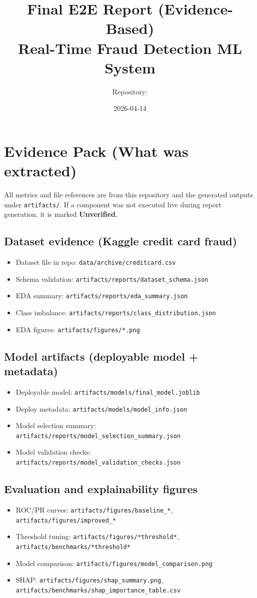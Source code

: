 \documentclass[11pt]{article}
\title{Final E2E Report (Evidence-Based)\\Real-Time Fraud Detection ML System}
\author{Repository: \code{Final_Project_DMM501_Group1}}
\date{2026-04-14}
\newcommand{\code}[1]{\texttt{#1}}
\newcommand{\statusunverified}{\textbf{Unverified}}
\begin{document}
\maketitle
\tableofcontents
\newpage

\section{Evidence Pack (What was extracted)}
All metrics and file references are from this repository and the generated outputs under \code{artifacts/}. If a component was not executed live during report generation, it is marked \statusunverified{}.

\subsection{Dataset evidence (Kaggle credit card fraud)}
\begin{itemize}
  \item Dataset file in repo: \code{data/archive/creditcard.csv}
  \item Schema validation: \code{artifacts/reports/dataset_schema.json}
  \item EDA summary: \code{artifacts/reports/eda_summary.json}
  \item Class imbalance: \code{artifacts/reports/class_distribution.json}
  \item EDA figures: \code{artifacts/figures/*.png}
\end{itemize}

\subsection{Model artifacts (deployable model + metadata)}
\begin{itemize}
  \item Deployable model: \code{artifacts/models/final_model.joblib}
  \item Deploy metadata: \code{artifacts/models/model_info.json}
  \item Model selection summary: \code{artifacts/reports/model_selection_summary.json}
  \item Model validation checks: \code{artifacts/reports/model_validation_checks.json}
\end{itemize}

\subsection{Evaluation and explainability figures}
\begin{itemize}
  \item ROC/PR curves: \code{artifacts/figures/baseline_*}, \code{artifacts/figures/improved_*}
  \item Threshold tuning: \code{artifacts/figures/*threshold*}, \code{artifacts/benchmarks/*threshold*}
  \item Model comparison: \code{artifacts/figures/model_comparison.png}
  \item SHAP: \code{artifacts/figures/shap_summary.png}, \code{artifacts/benchmarks/shap_importance_table.csv}
\end{itemize}
\end{document}
